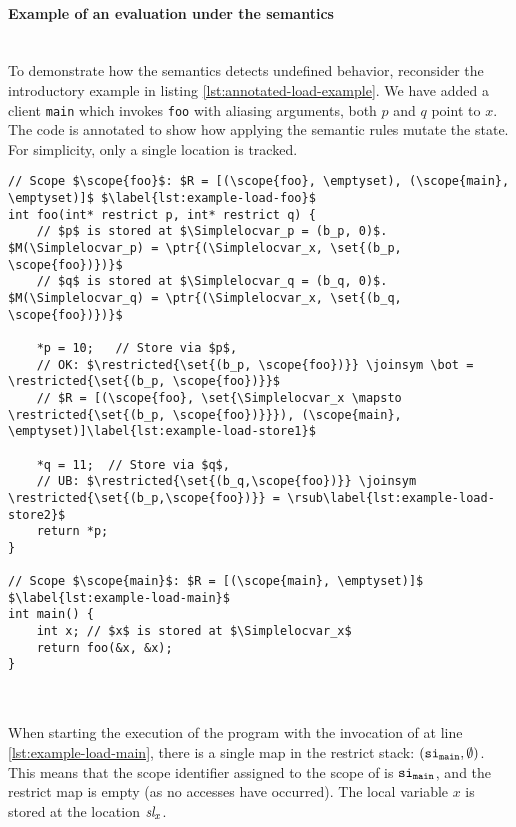 \newpage

\paragraph{Example of an evaluation under the \cink{} semantics} \leavevmode \\
To demonstrate how the semantics detects undefined behavior, reconsider the introductory example in listing \ref{lst:annotated-load-example}.
We have added a client \texttt{main} which invokes \texttt{foo} with aliasing arguments, \ie both $p$ and $q$ point to $x$.
The code is annotated to show how applying the \cink{} semantic rules mutate the state.
For simplicity, only a single location is tracked.

\begin{code}
\begin{verbatim}
// Scope $\scope{foo}$: $R = [(\scope{foo}, \emptyset), (\scope{main}, \emptyset)]$ $\label{lst:example-load-foo}$
int foo(int* restrict p, int* restrict q) {
    // $p$ is stored at $\Simplelocvar_p = (b_p, 0)$. $M(\Simplelocvar_p) = \ptr{(\Simplelocvar_x, \set{(b_p, \scope{foo})})}$
    // $q$ is stored at $\Simplelocvar_q = (b_q, 0)$. $M(\Simplelocvar_q) = \ptr{(\Simplelocvar_x, \set{(b_q, \scope{foo})})}$

    *p = 10;   // Store via $p$,
    // OK: $\restricted{\set{(b_p, \scope{foo})}} \joinsym \bot = \restricted{\set{(b_p, \scope{foo})}}$
    // $R = [(\scope{foo}, \set{\Simplelocvar_x \mapsto \restricted{\set{(b_p, \scope{foo})}}}), (\scope{main}, \emptyset)]\label{lst:example-load-store1}$
            
    *q = 11;  // Store via $q$,
    // UB: $\restricted{\set{(b_q,\scope{foo})}} \joinsym \restricted{\set{(b_p,\scope{foo})}} = \rsub\label{lst:example-load-store2}$
    return *p;
}

// Scope $\scope{main}$: $R = [(\scope{main}, \emptyset)]$ $\label{lst:example-load-main}$
int main() {
    int x; // $x$ is stored at $\Simplelocvar_x$
    return foo(&x, &x);
}
        
\end{verbatim}
\label{lst:annotated-load-example}
\end{code}
\leavevmode
\\
When starting the execution of the program with the invocation of  at line \ref{lst:example-load-main}, there
is a single map in the restrict stack: $(\mathtt{si}_\mathtt{main}, \emptyset)$. This means that the scope identifier assigned to the scope
of  is $\mathtt{si}_\mathtt{main}$, and the restrict map is empty (as no accesses have occurred).
The local variable $x$ is stored at the location $\textit{sl}_x$.

